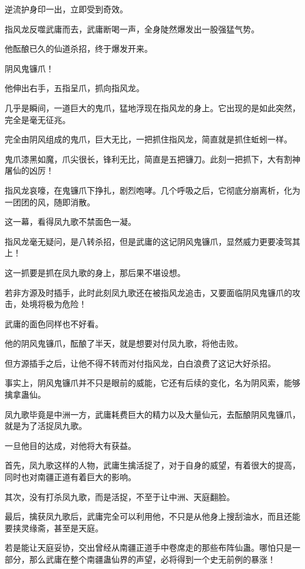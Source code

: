
\begin{this_body}

逆流护身印一出，立即受到奇效。

指风龙反噬武庸而去，武庸断喝一声，全身陡然爆发出一股强猛气势。

他酝酿已久的仙道杀招，终于爆发开来。

阴风鬼镰爪！

他伸出右手，五指呈爪，抓向指风龙。

几乎是瞬间，一道巨大的鬼爪，猛地浮现在指风龙的身上。它出现的是如此突然，完全是毫无征兆。

完全由阴风组成的鬼爪，巨大无比，一把抓住指风龙，简直就是抓住蚯蚓一样。

鬼爪漆黑如魔，爪尖很长，锋利无比，简直是五把镰刀。此刻一把抓下，大有割神屠仙的凶厉！

指风龙哀嚎，在鬼镰爪下挣扎，剧烈咆哮。几个呼吸之后，它彻底分崩离析，化为一团团的风，随即消散。

这一幕，看得凤九歌不禁面色一凝。

指风龙毫无疑问，是八转杀招，但是武庸的这记阴风鬼镰爪，显然威力更要凌驾其上！

这一抓要是抓在凤九歌的身上，那后果不堪设想。

若非方源及时插手，此时此刻凤九歌还在被指风龙追击，又要面临阴风鬼镰爪的攻击，处境将极为危险！

武庸的面色同样也不好看。

他的阴风鬼镰爪，酝酿了半天，就是想要对付凤九歌，将他击败。

但方源插手之后，让他不得不转而对付指风龙，白白浪费了这记大好杀招。

事实上，阴风鬼镰爪并不只是眼前的威能，它还有后续的变化，名为阴风索，能够擒拿蛊仙。

凤九歌毕竟是中洲一方，武庸耗费巨大的精力以及大量仙元，去酝酿阴风鬼镰爪，就是为了活捉凤九歌。

一旦他目的达成，对他将大有获益。

首先，凤九歌这样的人物，武庸生擒活捉了，对于自身的威望，有着很大的提高，同时也对南疆正道有着巨大的影响。

其次，没有打杀凤九歌，而是活捉，不至于让中洲、天庭翻脸。

最后，擒获凤九歌后，武庸完全可以利用他，不只是从他身上搜刮油水，而且还能要挟灵缘斋，甚至是天庭。

若是能让天庭妥协，交出曾经从南疆正道手中卷席走的那些布阵仙蛊。哪怕只是一部分，那么武庸在整个南疆蛊仙界的声望，必将得到一个史无前例的暴涨！


\end{this_body}
